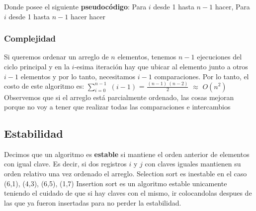 \documentclass[10pt,a4paper]{article}
\begin{document}
Donde posee el siguiente \textbf{pseudocódigo}:
\newline
\newline
Para $i$ desde 1 hasta $n-1$ hacer, 
\newline
\newline
Para $i$ desde 1 hasta $n-1$ hacer
\newline
\newline
{}
\newline
\newline
{} hacer
\newline
\newline
{} 
\newline
\newline
{} 
\newline
\newline
{} 
\newline
\newline
{} 
\newpage

\subsubsection{Complejidad}

Si queremos ordenar un arreglo de $n$ elementos, tenemos $n-1$ ejecuciones del ciclo principal y en la $i$-esima iteración hay que ubicar al elemento junto a otros $i-1$ elementos y por lo tanto, necesitamos $i-1$ comparaciones. 
\newline
\newline
Por lo tanto, el costo de este algoritmo es:
\newline
\newline
$\displaystyle \sum_{i=0}^{n-1}$ $(i-1)$ = $\displaystyle \frac{(n-1)~(n-2)}{2}$ $\approx$ $O(n^{2})$
\newline
\newline
Observemos que si el arreglo está parcialmente ordenado, las cosas mejoran porque no voy a tener que realizar todas las comparaciones e intercambios    

\subsection{Estabilidad}

Decimos que un algoritmo es \textbf{estable} si mantiene el orden anterior de elementos con igual clave. Es decir, si dos registros $i$ y $j$ con claves iguales mantienen su orden relativo una vez ordenado el arreglo.
\newline
\newline
Selection sort es inestable en el caso (6,1), (4,3), (6,5), (1,7)
\newline
\newline
Insertion sort es un algoritmo estable unicamente teniendo el cuidado de que si hay claves con el mismo, ir colocandolas despues de las que ya fueron insertadas para no perder la estabilidad.
\end{document}
